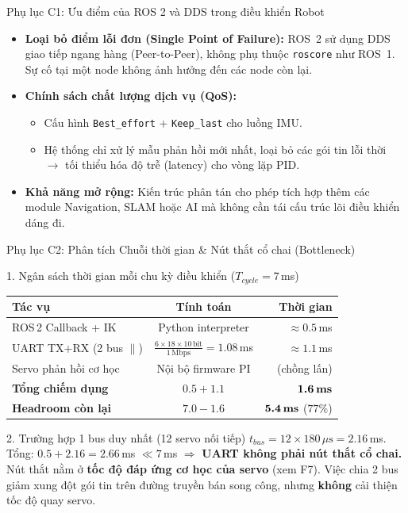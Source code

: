 \documentclass[10pt,aspectratio=169]{beamer}
\begin{document}
\begin{frame}{Phụ lục C1: Ưu điểm của ROS 2 và DDS trong điều khiển Robot}
  \begin{itemize}
      \item \textbf{Loại bỏ điểm lỗi đơn (Single Point of Failure):} ROS~2 sử dụng DDS giao tiếp ngang hàng (Peer-to-Peer), không phụ thuộc \texttt{roscore} như ROS~1. Sự cố tại một node không ảnh hưởng đến các node còn lại.
      \item \textbf{Chính sách chất lượng dịch vụ (QoS):} 
      \begin{itemize}
          \item Cấu hình \texttt{Best\_effort} + \texttt{Keep\_last} cho luồng IMU.
          \item Hệ thống chỉ xử lý mẫu phản hồi mới nhất, loại bỏ các gói tin lỗi thời $\rightarrow$ tối thiểu hóa độ trễ (latency) cho vòng lặp PID.
      \end{itemize}
      \item \textbf{Khả năng mở rộng:} Kiến trúc phân tán cho phép tích hợp thêm các module Navigation, SLAM hoặc AI mà không cần tái cấu trúc lõi điều khiển dáng đi.
  \end{itemize}
\end{frame}

\begin{frame}{Phụ lục C2: Phân tích Chuỗi thời gian \& Nút thắt cổ chai (Bottleneck)}
  \begin{block}{1. Ngân sách thời gian mỗi chu kỳ điều khiển ($T_{cycle} = 7\,$ms)}
      {\small
      \def\arraystretch{1.15}
      \centering
      \begin{tabular}{l c r}
          \toprule
          \textbf{Tác vụ} & \textbf{Tính toán} & \textbf{Thời gian} \\
          \midrule
          ROS\,2 Callback + IK & Python interpreter & $\approx 0.5\,$ms \\
          UART TX+RX (2 bus $\parallel$) & $\frac{6 \times 18 \times 10\,\text{bit}}{1\,\text{Mbps}} = 1.08\,$ms & $\approx 1.1\,$ms \\
          Servo phản hồi cơ học & Nội bộ firmware PI & (chồng lấn) \\
          \midrule
          \textbf{Tổng chiếm dụng} & $0.5 + 1.1$ & $\textbf{1.6\,ms}$ \\
          \textbf{Headroom còn lại} & $7.0 - 1.6$ & $\textbf{5.4\,ms}$ ($77\%$) \\
          \bottomrule
      \end{tabular}}
  \end{block}
  \begin{block}{2. Trường hợp 1 bus duy nhất (12 servo nối tiếp)}
      \footnotesize $t_{bus} = 12 \times 180\,\mu\text{s} = 2.16\,$ms. Tổng: $0.5 + 2.16 = 2.66\,$ms $\ll 7\,$ms $\Rightarrow$ \textbf{UART không phải nút thắt cổ chai.}\\
      Nút thắt nằm ở \textbf{tốc độ đáp ứng cơ học của servo} (xem F7). Việc chia 2 bus giảm xung đột gói tin trên đường truyền bán song công, nhưng \textbf{không} cải thiện tốc độ quay servo.
  \end{block}
\end{frame}
\end{document}
